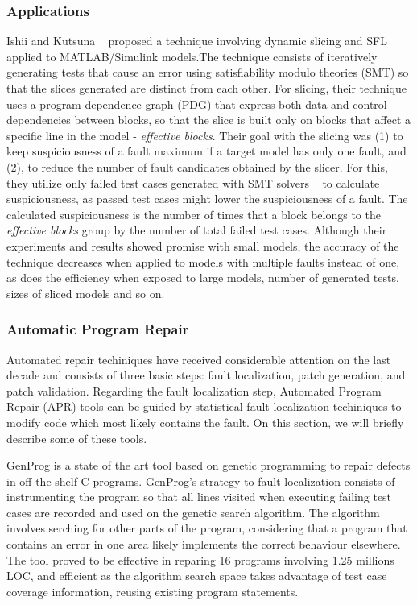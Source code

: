 \documentclass[sigplan,10pt,review,anonymous]{acmart}\settopmatter{printfolios=true,printccs=false,printacmref=false}
\begin{document}
\subsubsection{Applications}


Ishii and Kutsuna ~\cite{li-huo-chen-zhong-feng-li-2013} proposed a
technique involving dynamic slicing and SFL applied to MATLAB/Simulink
models.The technique consists of iteratively
generating tests that cause an error using satisfiability modulo
theories (SMT) so that the slices generated are distinct from each
other.  For slicing, their technique uses a program dependence graph
(PDG) that express both data and control dependencies between blocks,
so that the slice is built only on blocks that affect a specific line
in the model - \textit{effective blocks}.  Their goal with the slicing
was (1) to keep suspiciousness of a fault maximum if a target model
has only one fault, and (2), to reduce the number of fault candidates
obtained by the slicer.  For this, they utilize only failed test cases
generated with SMT solvers ~\cite{peleska-vorobev-lapschies-2011} to
calculate suspiciousness, as passed test cases might lower the
suspiciousness of a fault.  The calculated suspiciousness is the
number of times that a block belongs to the \textit{effective blocks}
group by the number of total failed test cases.  Although their
experiments and results showed promise with small models, the accuracy
of the technique decreases when applied to models with multiple faults
instead of one, as does the efficiency when exposed to large models,
number of generated tests, sizes of sliced models and so on.

\subsubsection{Automatic Program Repair}
Automated repair techiniques have received considerable attention on
the last decade and consists of three basic steps: fault localization, patch
generation, and patch validation.  Regarding the fault localization
step, Automated Program Repair (APR) tools can be guided by statistical
fault localization techiniques to modify code which most likely
contains the fault. On this section, we will briefly describe some of
these tools.

GenProg is a state of the art tool based on genetic
programming to repair defects in off-the-shelf C programs. GenProg's
strategy to fault localization consists of instrumenting the program
so that all lines visited when executing failing test cases are
recorded and used on the genetic search algorithm. The algorithm
involves serching for other parts of the program, considering that a
program that contains an error in one area likely implements the
correct behaviour elsewhere. The tool proved to be effective in
reparing 16 programs involving 1.25 millions LOC, and efficient as the
algorithm search space takes advantage of test case coverage
information, reusing  existing program statements.
\end{document}
